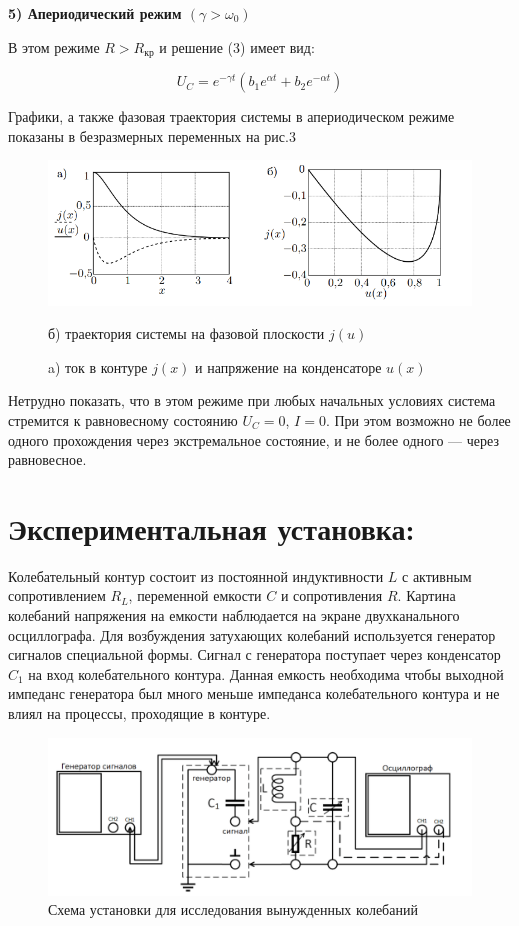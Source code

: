 \documentclass[a4paper, 12pt]{article}
\begin{document}
{\bf 5) Апериодический режим $(\gamma > \omega_0)$}

В этом режиме $R > R_{\text{кр}}$ и решение (3) имеет вид:

$$U_C = e^{-\gamma t} (b_1 e^{\alpha t} + b_2 e^{- \alpha t})$$

Графики, а также фазовая траектория системы в апериодическом режиме показаны в безразмерных переменных на рис.3

\begin{figure}[h!]
    \centering
    \includegraphics[scale = 0.3]{апериод.png}
    \caption{a) ток в контуре $j(x)$ и напряжение на конденсаторе $u(x)$} б) траектория системы на фазовой плоскости $j(u)$
\end{figure}

Нетрудно показать, что в этом режиме при любых начальных условиях система стремится к равновесному состоянию $U_C = 0$, $I = 0$.
При этом возможно не более одного прохождения через экстремальное состояние, и не более одного — через равновесное.

\section{Экспериментальная установка:}

Колебательный контур состоит из постоянной индуктивности $L$ с активным сопротивлением $R_L$, переменной емкости $C$ и сопротивления $R$. Картина колебаний
напряжения на емкости наблюдается на экране двухканального осциллографа. Для возбуждения затухающих колебаний используется генератор сигналов специальной
формы. Сигнал с генератора поступает через конденсатор $C_1$ на вход колебательного контура. Данная емкость необходима чтобы выходной импеданс генератора был
много меньше импеданса колебательного контура и не влиял на процессы, проходящие в контуре.

\begin{figure}[h]
    \centering
    \includegraphics[width=0.5\linewidth]{ust.png}
    \caption{Схема установки для исследования вынужденных колебаний}
\end{figure}
\end{document}

